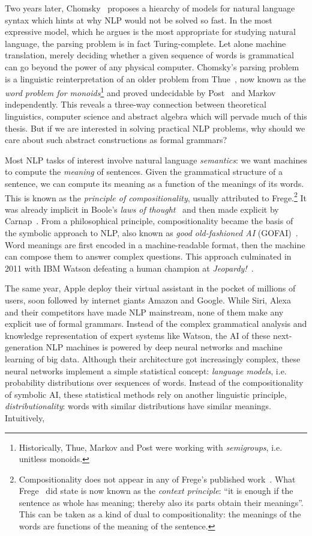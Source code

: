 Two years later, Chomsky~\cite{Chomsky56, Chomsky57} proposes a hiearchy of models for natural language syntax which hints at why NLP would not be solved so fast.
In the most expressive model, which he argues is the most appropriate for studying natural language, the parsing problem is in fact Turing-complete.
Let alone machine translation, merely deciding whether a given sequence of words is grammatical can go beyond the power of any physical computer.
Chomsky's parsing problem is a linguistic reinterpretation of an older problem from Thue~\cite{Thue14}, now known as the \emph{word problem for monoids}\footnote
{Historically, Thue, Markov and Post were working with \emph{semigroups}, i.e. unitless monoids.
} and proved undecidable by Post~\cite{Post47} and Markov~\cite{Markov47} independently.
This reveals a three-way connection between theoretical linguistics, computer science and abstract algebra which will pervade much of this thesis.
But if we are interested in solving practical NLP problems, why should we care about such abstract constructions as formal grammars?

Most NLP tasks of interest involve natural language \emph{semantics}: we want machines to compute the \emph{meaning} of sentences.
Given the grammatical structure of a sentence, we can compute its meaning as a function of the meanings of its words.
This is known as the \emph{principle of compositionality}, usually attributed to Frege.\footnote
{Compositionality does not appear in any of Frege's published work~\cite{Pelletier01}.
What Frege~\cite{Frege84} did state is now known as the \emph{context principle}:
``it is enough if the sentence as whole has meaning; thereby also its parts obtain their meanings''.
This can be taken as a kind of dual to compositionality: the meanings of the words are functions of the meaning of the sentence.}
It was already implicit in Boole's \emph{laws of thought}~\cite{Boole54} and then made explicit by Carnap~\cite{Carnap47}.
From a philosophical principle, compositionality became the basis of the symbolic approach to NLP, also known as \emph{good old-fashioned AI} (GOFAI)~\cite{Haugeland89}.
Word meanings are first encoded in a machine-readable format, then the machine can compose them to answer complex questions.
This approach culminated in 2011 with IBM Watson defeating a human champion at \emph{Jeopardy!}~\cite{LallyFodor11}.

The same year, Apple deploy their virtual assistant in the pocket of millions of users, soon followed by internet giants Amazon and Google.
While Siri, Alexa and their competitors have made NLP mainstream, none of them make any explicit use of formal grammars.
Instead of the complex grammatical analysis and knowledge representation of expert systems like Watson, the AI of these next-generation NLP machines is powered by deep neural networks and machine learning of big data.
Although their architecture got increasingly complex, these neural networks implement a simple statistical concept: \emph{language models}, i.e. probability distributions over sequences of words.
Instead of the compositionality of symbolic AI, these statistical methods rely on another linguistic principle, \emph{distributionality}: words with similar distributions have similar meanings.
Intuitively,

